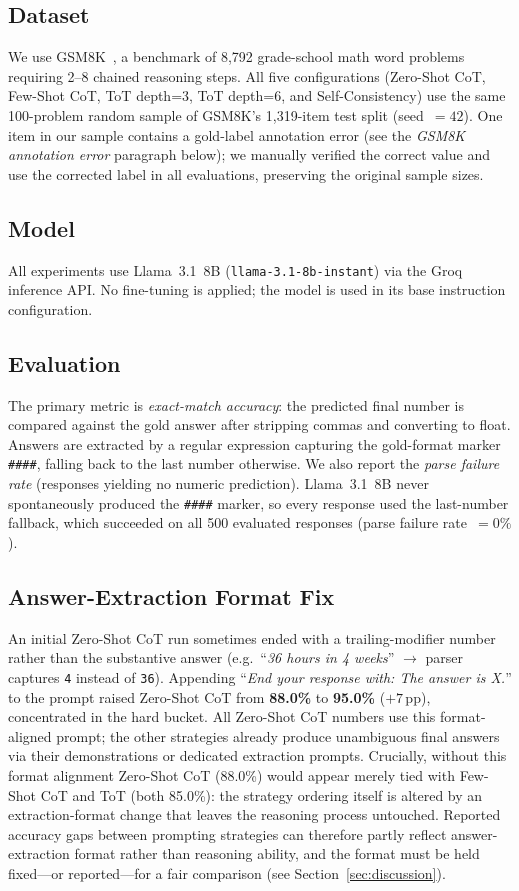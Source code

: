 \documentclass[conference]{IEEEtran}
\begin{document}
\subsection{Dataset}
We use GSM8K~\cite{cobbe2021gsm8k}, a benchmark of 8,792 grade-school
math word problems requiring 2--8 chained reasoning steps.
All five configurations (Zero-Shot CoT, Few-Shot CoT, ToT depth=3,
ToT depth=6, and Self-Consistency) use the same 100-problem random
sample of GSM8K's 1,319-item test split (seed~$= 42$).
One item in our sample contains a gold-label annotation error
(see the \emph{GSM8K annotation error} paragraph below); we manually
verified the correct value and use the corrected label in all
evaluations, preserving the original sample sizes.

\subsection{Model}
All experiments use Llama~3.1~8B (\texttt{llama-3.1-8b-instant}) via
the Groq inference API.
No fine-tuning is applied; the model is used in its base instruction
configuration.

\subsection{Evaluation}
The primary metric is \textit{exact-match accuracy}: the predicted
final number is compared against the gold answer after stripping commas
and converting to float.
Answers are extracted by a regular expression capturing the gold-format
marker \texttt{\#\#\#\#}, falling back to the last number otherwise.
We also report the \textit{parse failure rate} (responses yielding no
numeric prediction).
Llama~3.1~8B never spontaneously produced the \texttt{\#\#\#\#} marker,
so every response used the last-number fallback, which succeeded on all
500 evaluated responses (parse failure rate~$= 0\%$).

\subsection{Answer-Extraction Format Fix}
An initial Zero-Shot CoT run sometimes ended with a trailing-modifier
number rather than the substantive answer (e.g.\ ``\textit{36 hours
in 4 weeks}'' $\rightarrow$ parser captures \texttt{4} instead of \texttt{36}).
Appending ``\textit{End your response with: The answer is X.}'' to the
prompt raised Zero-Shot CoT from \textbf{88.0\%} to \textbf{95.0\%}
($+7$\,pp), concentrated in the hard bucket.
All Zero-Shot CoT numbers use this format-aligned prompt; the other
strategies already produce unambiguous final answers via their
demonstrations or dedicated extraction prompts.
Crucially, without this format alignment Zero-Shot CoT (88.0\%) would
appear merely tied with Few-Shot CoT and ToT (both 85.0\%): the
strategy ordering itself is altered by an extraction-format change that
leaves the reasoning process untouched.
Reported accuracy gaps between prompting strategies can therefore
partly reflect answer-extraction format rather than reasoning ability,
and the format must be held fixed---or reported---for a fair comparison
(see Section~\ref{sec:discussion}).
\end{document}
